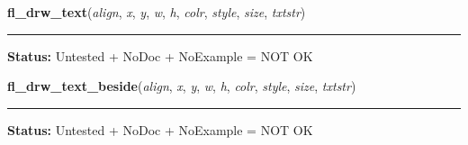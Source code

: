     \label{xformslib:library:fl_drw_text}

    \vspace{0.5ex}

\hspace{.8\funcindent}\begin{boxedminipage}{\funcwidth}

    \raggedright \textbf{fl\_drw\_text}(\textit{align}, \textit{x}, \textit{y}, \textit{w}, \textit{h}, \textit{colr}, \textit{style}, \textit{size}, \textit{txtstr})

    \vspace{-1.5ex}

    \rule{\textwidth}{0.5\fboxrule}
\setlength{\parskip}{2ex}
\setlength{\parskip}{1ex}
\textbf{Status:} Untested + NoDoc + NoExample = NOT OK



    \end{boxedminipage}

    \label{xformslib:library:fl_drw_text_beside}

    \vspace{0.5ex}

\hspace{.8\funcindent}\begin{boxedminipage}{\funcwidth}

    \raggedright \textbf{fl\_drw\_text\_beside}(\textit{align}, \textit{x}, \textit{y}, \textit{w}, \textit{h}, \textit{colr}, \textit{style}, \textit{size}, \textit{txtstr})

    \vspace{-1.5ex}

    \rule{\textwidth}{0.5\fboxrule}
\setlength{\parskip}{2ex}
\setlength{\parskip}{1ex}
\textbf{Status:} Untested + NoDoc + NoExample = NOT OK



    \end{boxedminipage}

    \label{xformslib:library:fl_drw_text_cursor}

    \vspace{0.5ex}

